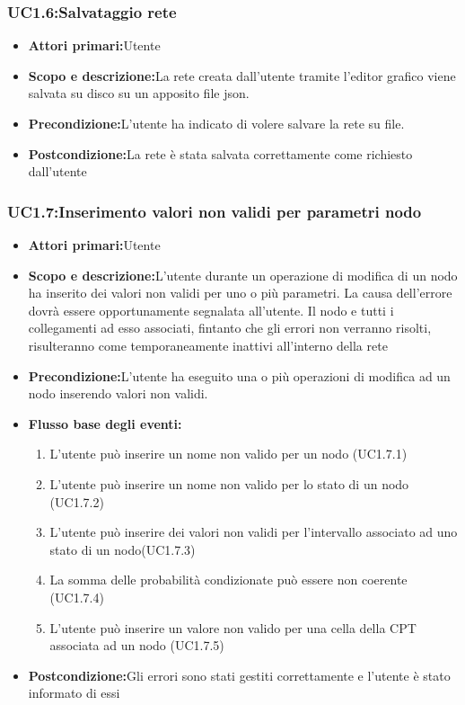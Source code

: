 \subsubsection{UC1.6:Salvataggio rete}
\begin{itemize}
	\item{\textbf{Attori primari:}Utente}
	\item{\textbf{Scopo e descrizione:}La rete creata dall'utente tramite l'editor grafico viene salvata su disco su un apposito file json.}
	\item{\textbf{Precondizione:}L'utente ha indicato di volere salvare la rete su file.}
	\item{\textbf{Postcondizione:}La rete è stata salvata correttamente come richiesto dall'utente}
\end{itemize}
\subsubsection{UC1.7:Inserimento valori non validi per parametri nodo}
\begin{itemize}
	\item{\textbf{Attori primari:}Utente}
	\item{\textbf{Scopo e descrizione:}L'utente durante un operazione di modifica di un nodo ha inserito dei valori non validi per uno o più parametri. La causa dell'errore dovrà essere opportunamente segnalata all'utente. Il nodo e tutti i collegamenti ad esso associati, fintanto che gli errori non verranno risolti, risulteranno come temporaneamente inattivi all'interno della rete}
	\item{\textbf{Precondizione:}L'utente ha eseguito una o più operazioni di modifica ad un nodo inserendo valori non validi.}
	\item{\textbf{Flusso base degli eventi:}}
	\begin{enumerate}
	\item{L'utente può inserire un nome non valido per un nodo (UC1.7.1)}
	\item{L'utente può inserire un nome non valido per lo stato di un nodo (UC1.7.2)}
	\item{L'utente può inserire dei valori non validi per l'intervallo associato ad uno stato di un nodo(UC1.7.3)}
	\item{La somma delle probabilità condizionate può essere non coerente (UC1.7.4)}
	\item{L'utente può inserire un valore non valido per una cella della CPT associata ad un nodo (UC1.7.5)}
	\end{enumerate}
	\item{\textbf{Postcondizione:}Gli errori sono stati gestiti correttamente e l'utente è stato informato di essi}
\end{itemize}
